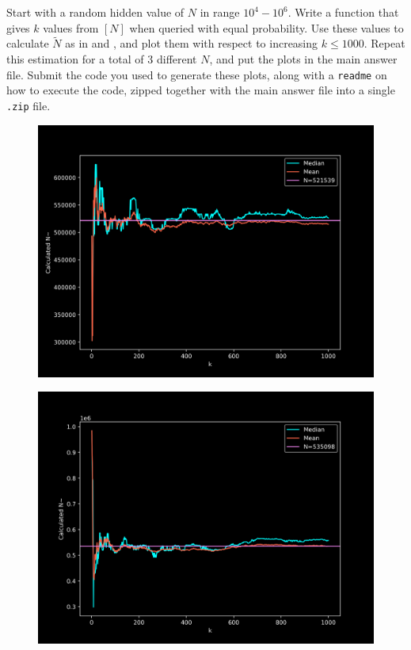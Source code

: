 \documentclass[12pt,titlepage]{report}
\begin{document}
\begin{enumerate}[label=(\alph*)]
    \hypertarget{q2c}{\item} Start with a random hidden value of $N$ in range $10^4-10^6$. Write a function that gives $k$ values from $[N]$ when queried with equal probability. Use these values to calculate $\widetilde{N}$ as in  and , and plot them with respect to increasing $k \leq 1000$. Repeat this estimation for a total of 3 different $N$, and put the plots in the main answer file. Submit the code you used to generate these plots, along with a \texttt{readme} on how to execute the code, zipped together with the main answer file into a single \texttt{.zip} file.
    {\begin{figure}[!ht]
        \centering
        \includegraphics[scale=0.7]{200057_n_521539.png}
    \end{figure}}
    {\begin{figure}[!ht]
        \centering
        \includegraphics[scale=0.7]{200057_n_535098.png}

\end{figure}}
\end{enumerate}
\end{document}
